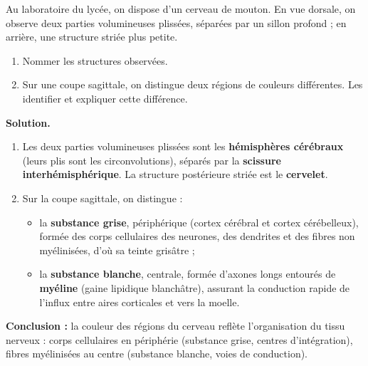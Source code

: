 \documentclass[11pt]{article}
\begin{document}
\begin{exoresolu}
Au laboratoire du lycée, on dispose d'un cerveau de mouton. En vue dorsale, on observe deux parties volumineuses plissées, séparées par un sillon profond ; en arrière, une structure striée plus petite.
\begin{enumerate}
\item Nommer les structures observées.
\item Sur une coupe sagittale, on distingue deux régions de couleurs différentes. Les identifier et expliquer cette différence.
\end{enumerate}
\tcblower
\textbf{Solution.}
\begin{enumerate}
\item Les deux parties volumineuses plissées sont les \textbf{hémisphères cérébraux} (leurs plis sont les circonvolutions), séparés par la \textbf{scissure interhémisphérique}. La structure postérieure striée est le \textbf{cervelet}.
\item Sur la coupe sagittale, on distingue :
\begin{itemize}
\item la \textbf{substance grise}, périphérique (cortex cérébral et cortex cérébelleux), formée des corps cellulaires des neurones, des dendrites et des fibres non myélinisées, d'où sa teinte grisâtre ;
\item la \textbf{substance blanche}, centrale, formée d'axones longs entourés de \textbf{myéline} (gaine lipidique blanchâtre), assurant la conduction rapide de l'influx entre aires corticales et vers la moelle.
\end{itemize}
\end{enumerate}
\textbf{Conclusion :} la couleur des régions du cerveau reflète l'organisation du tissu nerveux : corps cellulaires en périphérie (substance grise, centres d'intégration), fibres myélinisées au centre (substance blanche, voies de conduction).
\end{exoresolu}
\end{document}
